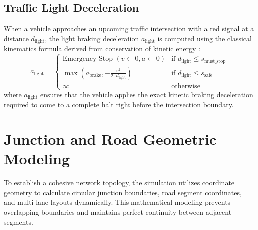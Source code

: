 \documentclass[../report_main.tex]{subfiles}
\begin{document}
\subsection{Traffic Light Deceleration}
When a vehicle approaches an upcoming traffic intersection with a red signal at a distance $d_{\text{light}}$, the light braking deceleration $a_{\text{light}}$ is computed using the classical kinematics formula derived from conservation of kinetic energy \cite{luongduyenbinh2010vldc1}:
\begin{equation}
    a_{\text{light}} = \begin{cases}
        \text{Emergency Stop } (v \leftarrow 0, a \leftarrow 0) & \text{if } d_{\text{light}} \leq s_{\text{must\_stop}} \\
        \max\left(a_{\text{brake}}, -\frac{v^2}{2 \cdot d_{\text{light}}}\right) & \text{if } d_{\text{light}} \leq s_{\text{safe}} \\
        \infty & \text{otherwise}
    \end{cases}
\end{equation}
where $a_{\text{light}}$ ensures that the vehicle applies the exact kinetic braking deceleration required to come to a complete halt right before the intersection boundary.

\section{Junction and Road Geometric Modeling}
To establish a cohesive network topology, the simulation utilizes coordinate geometry to calculate circular junction boundaries, road segment coordinates, and multi-lane layouts dynamically. This mathematical modeling prevents overlapping boundaries and maintains perfect continuity between adjacent segments.
\end{document}
